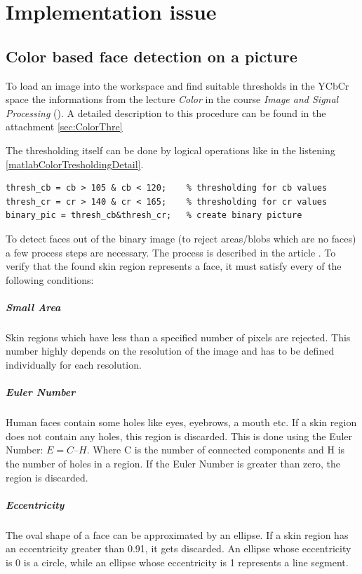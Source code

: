 \documentclass[SensorSystemsProject.tex]{subfiles}
\begin{document}
\chapter{Implementation issue}
\section{Color based face detection on a picture}
To load an image into the workspace and find suitable thresholds in the YCbCr space the informations from the lecture \textit{Color} in the course \textit{Image and Signal Processing} (\cite{RobAmaColor}). A detailed description to this procedure can be found in the attachment \ref{sec:ColorThre}

\medskip
The thresholding itself can be done by logical operations like in the listening \ref{matlabColorTresholdingDetail}.

\begin{lstlisting}[caption=Color thresholding, label= matlabColorTresholdingDetail]
% Thresholding -> binary
thresh_cb = cb > 105 & cb < 120;    % thresholding for cb values
thresh_cr = cr > 140 & cr < 165;    % thresholding for cr values
binary_pic = thresh_cb&thresh_cr;   % create binary picture
\end{lstlisting}

\medskip
To detect faces out of the binary image (to reject areas/blobs which are no faces) a few process steps are necessary. The process is described in the article \cite{RTFaceDetection}.
To verify that the found skin region represents a face, it must satisfy every of the following conditions:

\paragraph{Small Area} Skin regions which have less than a specified number of pixels are rejected. This number highly depends on the resolution of the image and has to be defined individually for each resolution.
\paragraph{Euler Number} Human faces contain some holes like eyes, eyebrows, a mouth etc. If a skin region does not contain any holes, this region is discarded. This is done using the Euler Number:	$E = C – H$. Where C is the number of connected components and H is the number of holes in a region. If the Euler Number is greater than zero, the region is discarded.
\paragraph{Eccentricity} The oval shape of a face can be approximated by an ellipse. If a skin region has an eccentricity greater than 0.91, it gets discarded. An ellipse whose eccentricity is 0 is a circle, while an ellipse whose eccentricity is 1 represents a line segment.
\end{document}
